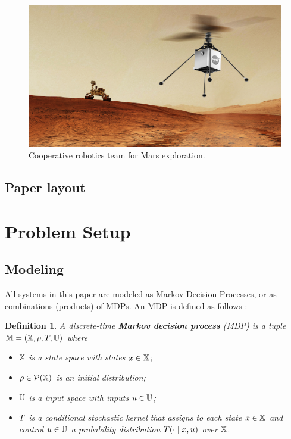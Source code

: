 \documentclass[conference]{IEEEtran}
\newtheorem{definition}{Definition}
\begin{document}
\begin{figure}
  \begin{center}
    \includegraphics[width=0.8\columnwidth]{figs/heli-rover.png}
  \end{center}
  \caption{Cooperative robotics team for Mars exploration.}
  \label{fig:heli-rover}
\end{figure}

\subsection{Paper layout}



\section{Problem Setup}
\label{sec:problem}

\subsection{Modeling}

All systems in this paper are modeled as Markov Decision Processes, or as combinations (products) of MDPs. An MDP is defined as follows \cite{Bertsekas1978}:

\begin{definition}
\label{def:MDP}
  A discrete-time \textbf{Markov decision process} (MDP) is a tuple $\mathbb{M} = (\mathbb{X}, \rho, T, \mathbb{U})$ where
  \begin{itemize}
    \item $\mathbb{X}$ is a state space with states $x\in\mathbb{X}$; %
    \item $\rho \in \mathcal P (\mathbb{X})$ is an initial distribution;
    \item $\mathbb{U}$ is a input space with inputs $u\in\mathbb{U}$;
    \item $T$ is a conditional stochastic kernel that assigns to each state $x\in \mathbb{X}$ and control $u\in \mathbb{U}$ a probability distribution $T(\cdot\mid x,u)$ over $\mathbb{X}$.
  \end{itemize}
\end{definition}
\end{document}
